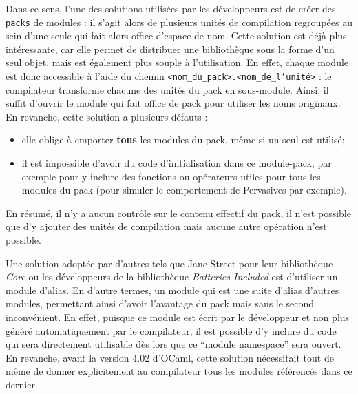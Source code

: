 \documentclass[11pt,a4paper]{report}
\begin{document}
Dans ce sens, l'une des solutions utilisées par les développeurs est de créer
des \texttt{packs} de modules : il s'agit alors de plusieurs unités de
compilation regroupées au sein d'une seule qui fait alors office d'espace de
nom. Cette solution est déjà plus intéressante, car elle permet de distribuer
une bibliothèque sous la forme d'un seul objet, mais est également plus souple à
l'utilisation. En effet, chaque module est donc accessible à l'aide du chemin
\texttt{<nom\_du\_pack>.<nom\_de\_l'unité>} : le compilateur transforme chacune
des unités du pack en sous-module. Ainsi, il suffit d'ouvrir le module qui fait
office de pack pour utiliser les noms originaux. En revanche, cette solution a
plusieurs défauts :
\begin{itemize}
\item elle oblige à emporter \textbf{tous} les modules du pack, même si un seul
  est utilisé;
\item il est impossible d'avoir du code d'initialisation dans ce module-pack,
  par exemple pour y inclure des fonctions ou opérateurs utiles pour tous les
  modules du pack (pour simuler le comportement de Pervasives par exemple).
\end{itemize}
En résumé, il n'y a aucun contrôle sur le contenu effectif du pack, il n'est
possible que d'y ajouter des unités de compilation mais aucune autre opération
n'est possible.

Une solution adoptée par d'autres tels que Jane Street pour leur bibliothèque
\emph{Core} ou les développeurs de la bibliothèque \emph{Batteries Included} est
d'utiliser un module d'alias. En d'autre termes, un module qui est une suite
d'alias d'autres modules, permettant ainsi d'avoir l'avantage du pack mais sans
le second inconvénient. En effet, puisque ce module est écrit par le développeur
et non plus généré automatiquement par le compilateur, il est possible d'y
inclure du code qui sera directement utilisable dès lors que ce ``module
namespace'' sera ouvert. En revanche, avant la version 4.02 d'OCaml, cette
solution nécessitait tout de même de donner explicitement au compilateur tous
les modules référencés dans ce dernier.
\end{document}
